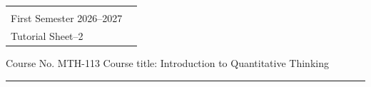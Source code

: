 \documentclass[a4paper,leqno,12pt]{amsart}
\begin{document}
\hspace*{1.9cm}%
\begin{tabular}{@{}p{}p{}@{}}
 {\raggedright
   \begin{center} 
   \textbf{AZIM PREMJI UNIVERSITY, BHOPAL}\\
   First Semester 2026--2027 \\
   Tutorial Sheet--2
   \end{center}
  } %
\end{tabular}

\noindent Course No. MTH-113 \hfill  Course title: Introduction to Quantitative Thinking
\hrule 
\vspace{.1cm}
\end{document}
